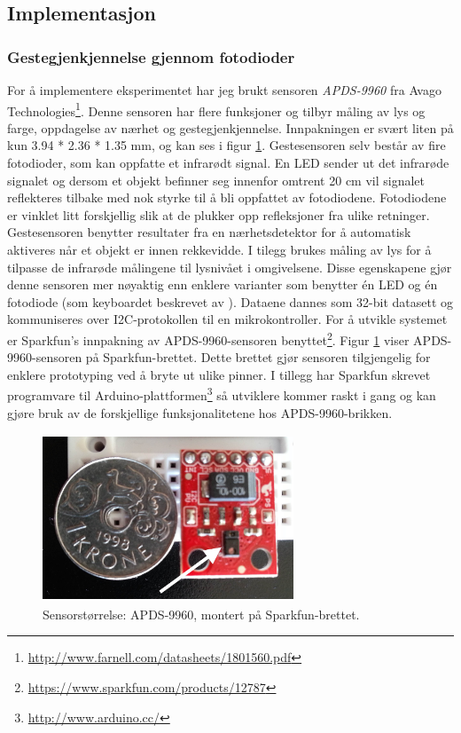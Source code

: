 \subsection{Implementasjon}

\subsubsection{Gestegjenkjennelse gjennom fotodioder}
For å implementere eksperimentet har jeg brukt sensoren \emph{APDS-9960} fra Avago Technologies\footnote{\url{http://www.farnell.com/datasheets/1801560.pdf}}. Denne sensoren har flere funksjoner og tilbyr måling av lys og farge, oppdagelse av nærhet og gestegjenkjennelse. Innpakningen er svært liten på kun 3.94 * 2.36 * 1.35 mm, og kan ses i figur \ref{fig:sensor-size}. Gestesensoren selv består av fire fotodioder, som kan oppfatte et infrarødt signal. En LED sender ut det infrarøde signalet og dersom et objekt befinner seg innenfor omtrent 20 cm vil signalet reflekteres tilbake med nok styrke til å bli oppfattet av fotodiodene. Fotodiodene er vinklet litt forskjellig slik at de plukker opp refleksjoner fra ulike retninger. Gestesensoren benytter resultater fra en nærhetsdetektor for å automatisk aktiveres når et objekt er innen rekkevidde. I tilegg brukes måling av lys for å tilpasse de infrarøde målingene til lysnivået i omgivelsene. Disse egenskapene gjør denne sensoren mer nøyaktig enn enklere varianter som benytter én LED og én fotodiode (som keyboardet beskrevet av \citet{96bytes}). Dataene dannes som 32-bit datasett og kommuniseres over I2C-protokollen til en mikrokontroller. For å utvikle systemet er Sparkfun's innpakning av APDS-9960-sensoren benyttet\footnote{\url{https://www.sparkfun.com/products/12787}}. Figur \ref{fig:sensor-size} viser APDS-9960-sensoren på Sparkfun-brettet. Dette brettet gjør sensoren tilgjengelig for enklere prototyping ved å bryte ut ulike pinner. I tillegg har Sparkfun skrevet programvare til Arduino-plattformen\footnote{\url{http://www.arduino.cc/}} så utviklere kommer raskt i gang og kan gjøre bruk av de forskjellige funksjonalitetene hos APDS-9960-brikken.
\begin{figure}[h]
\centering
\includegraphics[width=7.5cm, height=5cm]{fig/sensor-size}
\caption{Sensorstørrelse: APDS-9960, montert på Sparkfun-brettet.}
\label{fig:sensor-size}
\end{figure}

